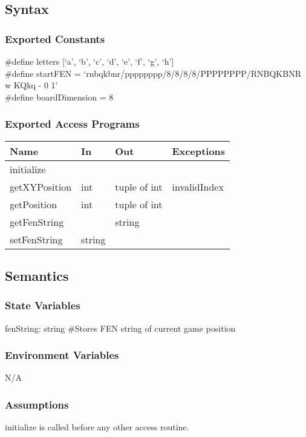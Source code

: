 \documentclass[12pt, titlepage]{article}
\begin{document}
    \subsection{Syntax}
    \subsubsection{Exported Constants}
        \#define letters [`a', `b', `c', `d', `e', `f', `g', `h']\\
        \#define startFEN = `rnbqkbnr/pppppppp/8/8/8/8/PPPPPPPP/RNBQKBNR w KQkq - 0 1'\\
        \#define boardDimension = 8

    \subsubsection{Exported Access Programs}
        \begin{center}
        \begin{tabular}{p{4.5cm} p{4cm} p{3cm} p{2.5cm}}
        \hline
        \textbf{Name} & \textbf{In} & \textbf{Out} & \textbf{Exceptions} \\
        \hline
        initialize & & & \\
        \hline
        getXYPosition & int & tuple of int & invalidIndex\\
        \hline
        getPosition & int & tuple of int & \\
        \hline
        getFenString & & string & \\
        \hline
        setFenString & string & & \\
        \hline
        \end{tabular}
        \end{center}

    \subsection{Semantics}
    \subsubsection{State Variables}
    fenString: string \#Stores FEN string of current game position

    \subsubsection{Environment Variables}
    N/A

    \subsubsection{Assumptions}
    initialize is called before any other access routine.
\end{document}
